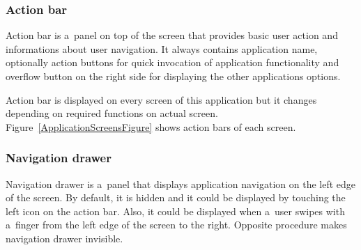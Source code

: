 \subsubsection{Action bar}
Action bar is a~panel on top of the screen that provides basic user action and informations about user navigation. It
always contains application name, optionally action buttons for quick invocation of application functionality and
overflow button on the right side for displaying the other applications options.

Action bar is displayed on every screen of this application but it changes depending on required functions on actual
screen. Figure~\ref{ApplicationScreensFigure} shows action bars of each screen.

\subsubsection{Navigation drawer}
Navigation drawer is a~panel that displays application navigation on the left edge of the screen. By default, it is
hidden and it could be displayed by touching the left icon on the action bar. Also, it could be displayed when a~user
swipes with a~finger from the left edge of the screen to the right. Opposite procedure makes navigation drawer
invisible.

